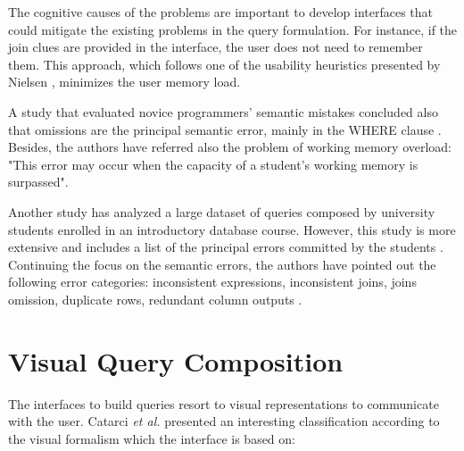 The cognitive causes of the problems are important to develop interfaces that could mitigate the existing problems in the query formulation. For instance, if the join clues are provided in the interface, the user does not need to remember them. This approach, which follows one of the usability heuristics presented by Nielsen \cite{usabilityEngineering}, minimizes the user memory load.

A study that evaluated novice programmers' semantic mistakes concluded also that omissions are the principal semantic error, mainly in the WHERE clause \cite{studentsSemanticMistakesInWritingSevenDifferentTypesOfSQLQueries}. Besides, the authors have referred also the problem of working memory overload: "This error may occur when the capacity of a student’s working memory is surpassed".

Another study has analyzed a large dataset of queries composed by university students enrolled in an introductory database course. However, this study is more extensive and includes a list of the principal errors committed by the students \cite{errorsAndComplicationsInSQLQueryFormulation}. Continuing the focus on the semantic errors, the authors have pointed out the following error categories: inconsistent expressions, inconsistent joins, joins omission, duplicate rows, redundant column outputs \cite{errorsAndComplicationsInSQLQueryFormulation}.


\section{Visual Query Composition}
\label{sec:visual_query_composition}

The interfaces to build queries resort to visual representations to communicate with the user. Catarci \textit{et al.} \cite{visualQuerySystemsForDatabases_aSurvey} presented an interesting classification according to the visual formalism which the interface is based on:

